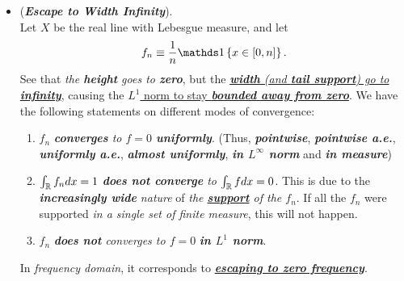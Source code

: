 \documentclass[11pt]{article}
\begin{document}
\begin{itemize}
\item \begin{example} (\emph{\textbf{Escape to Width Infinity}}).\\
Let $X$ be the real line with Lebesgue measure, and let
\begin{align*}
f_n \equiv \frac{1}{n}\ind{x \in [0,n]}.
\end{align*} See that \emph{the \textbf{height} goes to \textbf{zero}}, but the \underline{\emph{\textbf{width} (and \textbf{tail support}) go to \textbf{infinity}}}, causing the \underline{$L^1$ norm to stay \textbf{\emph{bounded away from zero}}}. We have the following statements on different modes of convergence:
\begin{enumerate}
\item  $f_n$ \emph{\textbf{converges}  to $f = 0$ \textbf{uniformly}}. (Thus,  \emph{\textbf{pointwise}}, \emph{\textbf{pointwise a.e.}}, \emph{\textbf{uniformly a.e.}}, \emph{\textbf{almost uniformly}}, \emph{\textbf{in $L^{\infty}$ norm}} and \emph{\textbf{in measure}})
\item $\int_{{\mathbb R}}f_{n} dx = 1$ \emph{\textbf{does not converge} to $\int_{{\mathbb R}} f dx = 0$}. 
This is due to the \emph{\textbf{increasingly wide} nature} of \emph{the \underline{\textbf{support}} of the $f_n$}. If all the $f_n$ were supported \emph{in a single set of finite measure}, this will not happen. 
\item $f_n$ \emph{\textbf{does not} converges to $f = 0$} \emph{\textbf{in $L^1$ norm}}. 
\end{enumerate}   In \emph{frequency domain}, it corresponds to \emph{\textbf{\underline{escaping to zero frequency}}}. 
\end{example}


\end{itemize}
\end{document}
